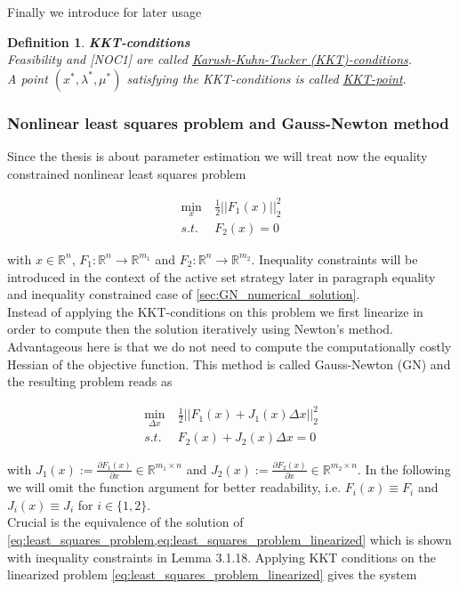 \documentclass{scrartcl}[12pt, halfparskip]
\numberwithin{equation}{section}
\numberwithin{figure}{section}
\numberwithin{table}{section}
\newtheorem{Definition}{Definition}
\begin{document}
Finally we introduce for later usage 

\begin{Definition} \textbf{KKT-conditions} \\
	Feasibility and [NOC1] are called \underline{Karush-Kuhn-Tucker (KKT)-conditions}. \\
	A point $(x^*, \lambda^*, \mu^*)$ satisfying the KKT-conditions is called \underline{KKT-point}.
\end{Definition}


\subsubsection{Nonlinear least squares problem and Gauss-Newton method}
\label{sec:Gauss_Newton}
Since the thesis is about parameter estimation we will treat now the equality constrained nonlinear least squares problem

\begin{align}
	\min_x \ & \frac{1}{2}|| F_1(x) ||_2^2 \label{eq:least_squares_problem} \\
	s.t. \ & F_2(x) = 0 \nonumber
\end{align}

with $x \in \mathbb{R}^n$, $F_1: \mathbb{R}^n \rightarrow \mathbb{R}^{m_1}$ and $F_2: \mathbb{R}^n \rightarrow \mathbb{R}^{m_2}$. Inequality constraints will be introduced in the context of the active set strategy later in paragraph equality and inequality constrained case of \cref{sec:GN_numerical_solution}. \\
Instead of applying the KKT-conditions on this problem we first linearize in order to compute then the solution iteratively using Newton's method. Advantageous here is that we do not need to compute the computationally costly Hessian of the objective function. This method is called Gauss-Newton (GN) and the resulting problem reads as

\begin{align}
\min_{\Delta x} \ & \frac{1}{2}|| F_1(x) + J_1(x) \Delta x ||_2^2 \label{eq:least_squares_problem_linearized} \\
s.t. \ & F_2(x) + J_2(x) \Delta x = 0 \nonumber
\end{align}

with $J_1(x) := \frac{\partial F_1(x)}{\partial x} \in \mathbb{R}^{m_1 \times n}$ and $J_2(x) := \frac{\partial F_2(x)}{\partial x} \in \mathbb{R}^{m_2 \times n}$. In the following we will omit the function argument for better readability, i.e. $F_i(x) \equiv F_i$ and $J_i(x) \equiv J_i$ for $i \in \{1,2\}$. \\
Crucial is the equivalence of the solution of \cref{eq:least_squares_problem,eq:least_squares_problem_linearized} which is shown with inequality constraints in \cite{diss_bock} Lemma 3.1.18.
Applying KKT conditions on the linearized problem \cref{eq:least_squares_problem_linearized} gives the system
\end{document}
